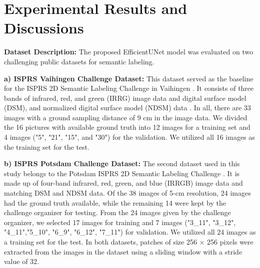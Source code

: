 \documentclass[journal]{IEEEtran}
\begin{document}
\section{Experimental Results and Discussions} 
\textbf{Dataset Description:} The proposed EfficientUNet model was evaluated on two challenging public datasets for semantic labeling.

\textbf{a)	ISPRS Vaihingen Challenge Dataset:} This dataset served as the baseline for the ISPRS 2D Semantic Labeling Challenge in Vaihingen \cite{labeling_2016}. It consists of three bands of infrared, red, and green (IRRG) image data and digital surface model (DSM), and normalized digital surface model (NDSM) data \cite{Gerke2014UseOT}. In all, there are 33 images with a ground sampling distance of 9 cm in the image data. We divided the 16 pictures with available ground truth into 12 images for a training set and 4 images ("5", "21", "15", and "30") for the validation. We utilized all 16 images as the training set for the test.

\textbf{b) ISPRS Potsdam Challenge Dataset:} The second dataset used in this study belongs to the Potsdam ISPRS 2D Semantic Labeling Challenge \cite{labeling_2016}. It is made up of four-band infrared, red, green, and blue (IRRGB) image data and matching DSM and NDSM data. Of the 38 images of 5{-}cm resolution, 24 images had the ground truth available, while the remaining 14 were kept by the challenge organizer for testing. From the 24 images given by the challenge organizer, we selected 17 images for training and 7 images ({"}3{\_}11{"}, {"}3{\_}12{"}, {"}4{\_}11{"},{"}5{\_}10{"}, {"}6{\_}9{"}, {"}6{\_}12{"}, {"}7{\_}11{"}) for validation. We utilized all 24 images as a training set for the test. 
In both datasets, patches of size 256 × 256 pixels were extracted from the images in the dataset using a sliding window with a stride value of 32.  
\end{document}
